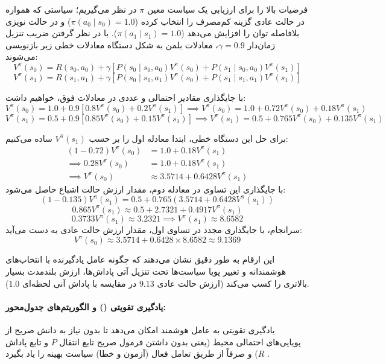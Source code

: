 \documentclass[oneside,openany,phd]{TMU-Thesis}
\begin{document}
فرضیات بالا را برای ارزیابی یک سیاست معین $\pi$ در نظر می‌گیریم؛ سیاستی که همواره در حالت عادی گزینه کم‌مصرف را انتخاب کرده ($\pi(a_0 \mid s_0) = 1.0$) و در حالت نویزی بلافاصله توان را افزایش می‌دهد ($\pi(a_1 \mid s_1) = 1.0$). با در نظر گرفتن ضریب تنزیل زمان‌دار $\gamma = 0.9$، معادلات بلمن به شکل دستگاه معادلات خطی زیر بازنویسی می‌شوند:
$$V^\pi(s_0) = R(s_0, a_0) + \gamma \left[ P(s_0 \mid s_0, a_0) V^\pi(s_0) + P(s_1 \mid s_0, a_0) V^\pi(s_1) \right]$$
$$V^\pi(s_1) = R(s_1, a_1) + \gamma \left[ P(s_0 \mid s_1, a_1) V^\pi(s_0) + P(s_1 \mid s_1, a_1) V^\pi(s_1) \right]$$

با جایگذاری مقادیر احتمالی و عددی در معادلات فوق، خواهیم داشت:
$$V^\pi(s_0) = 1.0 + 0.9 \left[ 0.8 V^\pi(s_0) + 0.2 V^\pi(s_1) \right] \implies V^\pi(s_0) = 1.0 + 0.72 V^\pi(s_0) + 0.18 V^\pi(s_1)$$
$$V^\pi(s_1) = 0.5 + 0.9 \left[ 0.85 V^\pi(s_0) + 0.15 V^\pi(s_1) \right] \implies V^\pi(s_1) = 0.5 + 0.765 V^\pi(s_0) + 0.135 V^\pi(s_1)$$

برای حل این دستگاه خطی، ابتدا معادله اول را بر حسب $V^\pi(s_1)$ ساده می‌کنیم:
\begin{align*}
(1 - 0.72) V^\pi(s_0) &= 1.0 + 0.18 V^\pi(s_1) \\
\implies 0.28 V^\pi(s_0) &= 1.0 + 0.18 V^\pi(s_1) \\
\implies V^\pi(s_0) &\approx 3.5714 + 0.6428 V^\pi(s_1)
\end{align*}
با جایگذاری این تساوی در معادله دوم، مقدار ارزش حالت اشباع حاصل می‌شود:
$$(1 - 0.135) V^\pi(s_1) = 0.5 + 0.765 \left( 3.5714 + 0.6428 V^\pi(s_1) \right)$$
$$0.865 V^\pi(s_1) \approx 0.5 + 2.7321 + 0.4917 V^\pi(s_1)$$
$$0.3733 V^\pi(s_1) \approx 3.2321 \implies V^\pi(s_1) \approx 8.6582$$
سرانجام، با جایگذاری مجدد در تساوی اول، مقدار ارزش حالت عادی به دست می‌آید:
$$V^\pi(s_0) \approx 3.5714 + 0.6428 \times 8.6582 \approx 9.1369$$

این ارقام به طور دقیق نشان می‌دهند که چگونه عامل یادگیرنده با انتخاب‌های هوشمندانه و تغییر پویا سیاست‌ها تحت تنزیل آتی پاداش‌ها، ارزش بلندمدت بسیار بالاتری را کسب می‌کند (ارزش حالت عادی $9.13$ در مقایسه با پاداش آنی لحظه‌ای $1.0$).

\paragraph{یادگیری تقویتی () و الگوریتم‌های جدول‌محور:}

یادگیری تقویتی به عامل هوشمند امکان می‌دهد تا بدون نیاز به دانش صریح از پویایی‌های احتمالی محیط (یعنی بدون داشتن فرمول صریح تابع انتقال $P$ و تابع پاداش $R$) و صرفاً از طریق تعامل فعال (آزمون و خطا) سیاست بهینه را یاد بگیرد \cite{sutton2018reinforcement}. 
\end{document}
